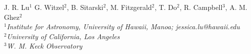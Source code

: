 J. R. Lu${}^1$
G. Witzel${}^2$,
B. Sitarski${}^2$,
M. Fitzgerald${}^2$,
T. Do${}^2$,
R. Campbell${}^3$,
A. M. Ghez${}^2$
\\
${}^1${\em Institute for Astronomy, University of Hawaii, Manoa; jessica.lu@hawaii.edu}
\\
${}^2${\em University of California, Los Angeles}
\\
${}^3${\em W. M. Keck Observatory}
